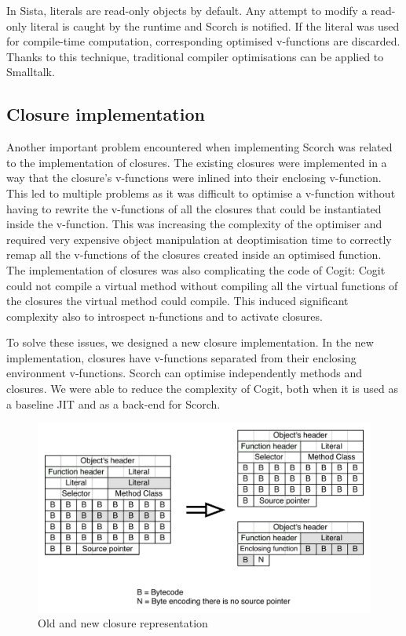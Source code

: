 \documentclass[a4paper,12pt,twoside]{../includes/ThesisStyle}
\begin{document}
In Sista, literals are read-only objects by default. Any attempt to modify a read-only literal is caught by the runtime and Scorch is notified. If the literal was used for compile-time computation, corresponding optimised v-functions are discarded. Thanks to this technique, traditional compiler optimisations can be applied to Smalltalk.

\subsection{Closure implementation}

Another important problem encountered when implementing Scorch was related to the implementation of closures. The existing closures were implemented in a way that the closure's v-functions were inlined into their enclosing v-function. This led to multiple problems as it was difficult to optimise a v-function without having to rewrite the v-functions of all the closures that could be instantiated inside the v-function. This was increasing the complexity of the optimiser and required very expensive object manipulation at deoptimisation time to correctly remap all the v-functions of the closures created inside an optimised function. The implementation of closures was also complicating the code of Cogit: Cogit could not compile a virtual method without compiling all the virtual functions of the closures the virtual method could compile. This induced significant complexity also to introspect n-functions and to activate closures. 

To solve these issues, we designed a new closure implementation. In the new implementation, closures have v-functions separated from their enclosing environment v-functions. Scorch can optimise independently methods and closures. We were able to reduce the complexity of Cogit, both when it is used as a baseline JIT and as a back-end for Scorch.

\begin{figure}[h!]
    \begin{center}
        \includegraphics[width=0.85\linewidth]{CompiledBlock}
        \caption{Old and new closure representation}
        \label{fig:CompiledBlock}
    \end{center}
\end{figure}
\end{document}
